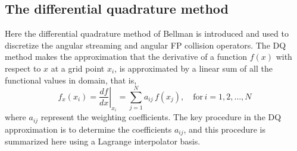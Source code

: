 \documentclass[../main.tex]{subfiles}
\begin{document}
\subsection{The differential quadrature method}
Here the differential quadrature method of Bellman \cite{Bellman-1972} is introduced and used to discretize the angular streaming and angular FP collision operators. The DQ method makes the approximation that the derivative of a function $f(x)$ with respect to $x$ at a grid point $x_i$, is approximated by a linear sum of all the functional values in domain, that is,
\begin{equation}
    f_x(x_i) = \left.\dfrac{df}{dx}\right|_{x_i} = \sum_{j=1}^N a_{ij} \, f(x_j), \quad \text{for} \, i=1,2,\ldots,N
\end{equation} 
where $a_{ij}$ represent the weighting coefficients. The key procedure in the DQ approximation is to determine the coefficients $a_{ij}$, and this procedure is summarized here using a Lagrange interpolator basis. 
\end{document}
